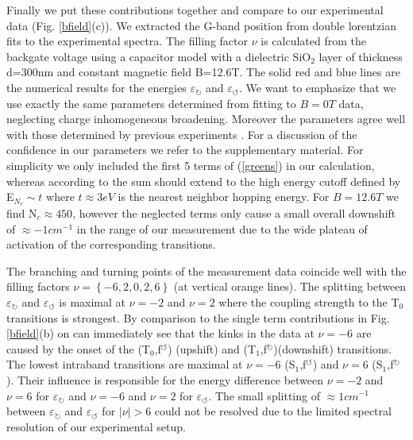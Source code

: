 \documentclass[prl,aps,superscriptaddress,showpacs,reprint]{revtex4-1}
\begin{document}
Finally we put these contributions together and compare to our experimental data (Fig. \ref{bfield}(c)). We extracted the G-band position from double lorentzian fits to the experimental spectra. The filling factor $\nu$ is calculated from the backgate voltage using a capacitor model with a dielectric SiO$_2$ layer of thickness d=300nm and constant magnetic field B=12.6T.
The solid red and blue lines are the numerical results for the energies $\varepsilon_\circlearrowright$ and $\varepsilon_\circlearrowleft$.
We want to emphasize that we use exactly the same parameters determined from fitting to $B=0T$ data, neglecting charge inhomogeneous broadening. Moreover the parameters agree well with those determined by previous experiments \cite{PhysRevLett.110.227402,kossacki2012circular}.
For a discussion of the confidence in our parameters we refer to the supplementary material.
For simplicity we only included the first 5 terms of (\ref{greens}) in our calculation, whereas according to \cite{goerbig2011electronic} the sum should extend to the high energy cutoff defined by E$_{N_c} \sim t$ where $t\approx 3eV$ is the nearest neighbor hopping energy. For $B=12.6T$ we find N$_c\approx 450$, however the neglected terms only cause a small overall downshift of $\approx -1cm^{-1}$ in the range of our measurement due to the wide plateau of activation of the corresponding transitions.

The branching and turning points of the measurement data coincide well with the filling factors $\nu=\left\lbrace -6,2,0,2,6 \right\rbrace$ (at vertical orange lines). The splitting between $\varepsilon_\circlearrowright$ and $\varepsilon_\circlearrowleft$ is maximal at $\nu=-2$ and $\nu=2$ where the coupling strength to the T$_0$ transitions is strongest. By comparison to the single term contributions in Fig. \ref{bfield}(b) on can immediately see that the kinks in the data at $\nu=-6$ are caused by the onset of the (T$_0$,f$^\circlearrowleft$) (upshift) and (T$_1$,f$^\circlearrowright$)(downshift) transitions. The lowest intraband transitions are maximal at $\nu=-6$ (S$_1$,f$^\circlearrowleft$) and $\nu=6$ (S$_1$,f$^\circlearrowright$). Their influence is responsible for the energy difference between $\nu=-2$ and $\nu=6$ for $\varepsilon_\circlearrowright$ and $\nu=-6$ and $\nu=2$ for $\varepsilon_\circlearrowleft$. The small splitting of $\approx 1cm^{-1}$ between $\varepsilon_\circlearrowright$ and $\varepsilon_\circlearrowleft$ for $\left|\nu\right|>6$ could not be resolved due to the limited spectral resolution of our experimental setup. 
\end{document}
